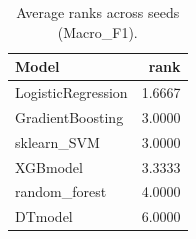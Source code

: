 \begin{table}[t]
\centering
\begin{tabular}{lr}
\toprule
Model & rank \\
\midrule
LogisticRegression & 1.6667 \\
GradientBoosting & 3.0000 \\
sklearn_SVM & 3.0000 \\
XGBmodel & 3.3333 \\
random_forest & 4.0000 \\
DTmodel & 6.0000 \\
\bottomrule
\end{tabular}
\caption{Average ranks across seeds (Macro_F1).}
\label{tab:avg_rank_Macro_F1}
\end{table}